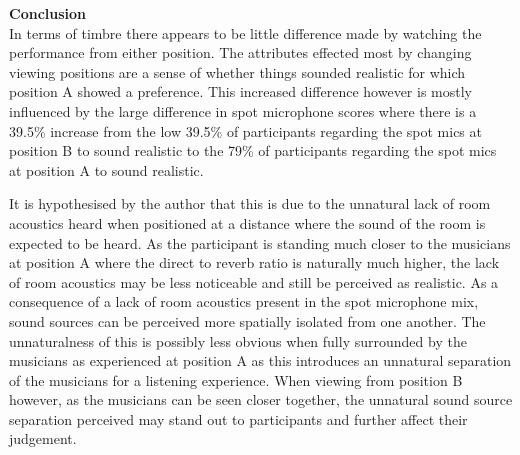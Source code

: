 	\begin{center}
	\begin{table}[h]
		\caption{Table showing the percentage difference between each pair of microphones calculated by $A - B$}
		\label{ana4:barData}
	\end{table}
	\end{center}


	\textbf{Conclusion} \\

		In terms of timbre there appears to be little difference made by watching the performance from either position. The attributes effected most by changing viewing positions are a sense of whether things sounded realistic for which position A showed a preference. This increased difference however is mostly influenced by the large difference in spot microphone scores where there is a 39.5\% increase from the low 39.5\% of participants regarding the spot mics at position B to sound realistic to the 79\% of participants regarding the spot mics at position A to sound realistic. 

		It is hypothesised by the author that this is due to the unnatural lack of room acoustics heard when positioned at a distance where the sound of the room is expected to be heard. As the participant is standing much closer to the musicians at position A where the direct to reverb ratio is naturally much higher, the lack of room acoustics may be less noticeable and still be perceived as realistic. As a consequence of a lack of room acoustics present in the spot microphone mix, sound sources can be perceived more spatially isolated from one another. The unnaturalness of this is possibly less obvious when fully surrounded by the musicians as experienced at position A as this introduces an unnatural separation of the musicians for a listening experience. When viewing from position B however, as the musicians can be seen closer together, the unnatural sound source separation perceived may stand out to participants and further affect their judgement. \\


